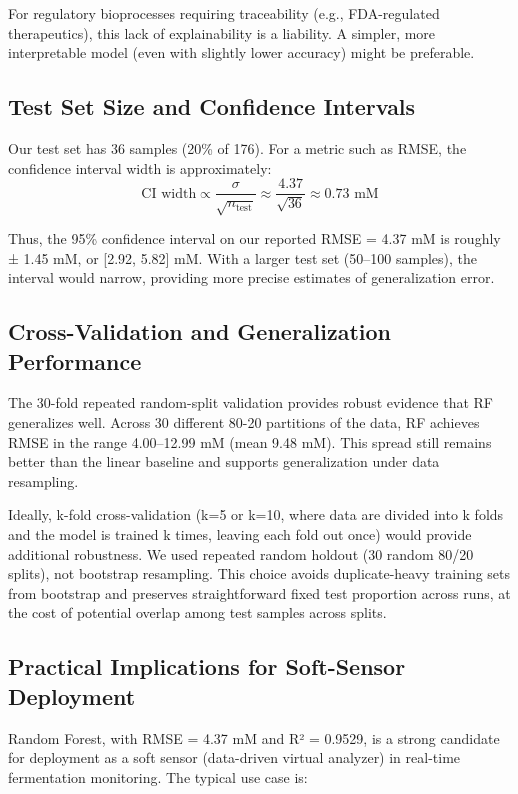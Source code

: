 \documentclass[conference]{IEEEtran}
\begin{document}
For regulatory bioprocesses requiring traceability (e.g., FDA-regulated therapeutics), this lack of explainability is a liability. A simpler, more interpretable model (even with slightly lower accuracy) might be preferable.

\subsection{Test Set Size and Confidence Intervals}
Our test set has 36 samples (20\% of 176). For a metric such as RMSE, the confidence interval width is approximately:
\[
\text{CI width} \propto \frac{\sigma}{\sqrt{n_{\text{test}}}} \approx \frac{4.37}{\sqrt{36}} \approx 0.73 \text{ mM}
\]

Thus, the 95\% confidence interval on our reported RMSE = 4.37 mM is roughly ± 1.45 mM, or [2.92, 5.82] mM. With a larger test set (50–100 samples), the interval would narrow, providing more precise estimates of generalization error.

\subsection{Cross-Validation and Generalization Performance}
The 30-fold repeated random-split validation provides robust evidence that RF generalizes well. Across 30 different 80-20 partitions of the data, RF achieves RMSE in the range 4.00–12.99 mM (mean 9.48 mM). This spread still remains better than the linear baseline and supports generalization under data resampling.

Ideally, k-fold cross-validation (k=5 or k=10, where data are divided into k folds and the model is trained k times, leaving each fold out once) would provide additional robustness. We used repeated random holdout (30 random 80/20 splits), not bootstrap resampling. This choice avoids duplicate-heavy training sets from bootstrap and preserves straightforward fixed test proportion across runs, at the cost of potential overlap among test samples across splits.

\subsection{Practical Implications for Soft-Sensor Deployment}
Random Forest, with RMSE = 4.37 mM and R² = 0.9529, is a strong candidate for deployment as a soft sensor (data-driven virtual analyzer) in real-time fermentation monitoring. The typical use case is:
\end{document}
